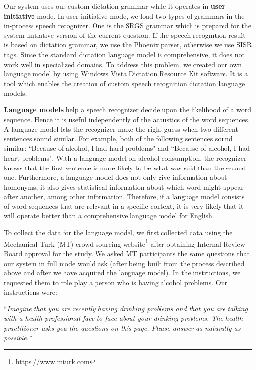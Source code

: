 \begin{sloppy}
Our system uses our custom dictation grammar while it operates in {\bf user initiative} mode. In user initiative mode, we load two types of grammars in the in-process speech recognizer. One is the SRGS grammar which is prepared for the system initiative version of the current question. If the speech recognition result is based on dictation grammar, we use the Phoenix parser, otherwise we use SISR tags. Since the standard dictation language model is comprehensive, it does not work well in specialized domains. To address this problem, we  created our own language model by using Windows Vista Dictation Resource Kit software. It is a tool which enables the creation of custom speech recognition dictation language models. 

{\bf Language models} help a speech recognizer decide upon the likelihood of a word sequence.  Hence it is useful independently  of the acoustics of the word sequences. A language model lets the recognizer make the right guess when two different sentences sound similar.  For example, both of the following sentences sound similar: ``Because of alcohol, I had hard problems" and ``Because of alcohol, I had heart problems". With a language model on alcohol consumption, the recognizer knows that the first sentence is more likely to be what was said than the second one.  Furthermore, a language model does not only give information about homonyms, it also gives statistical information about which word might appear after another, among other information.  Therefore, if a language model consists of word sequences that are relevant in a specific context, it is very likely that it will operate better than a comprehensive language model for English.

To collect the data for the language model, we first collected data using the Mechanical Turk (MT) crowd sourcing website\footnote{https://www.mturk.com} after obtaining Internal Review Board approval for the study.  We asked MT participants the same questions that our system  in full mode would ask (after being built from the process described above and after we have acquired the language model). In the instructions, we requested them to role play a person who is having alcohol problems. Our instructions were:

 ``\textit{Imagine that you are recently having drinking problems and that you are talking with a health professional face-to-face about your drinking problems. The health practitioner asks you the questions on this page. Please answer as naturally as possible."}


\end{sloppy}
